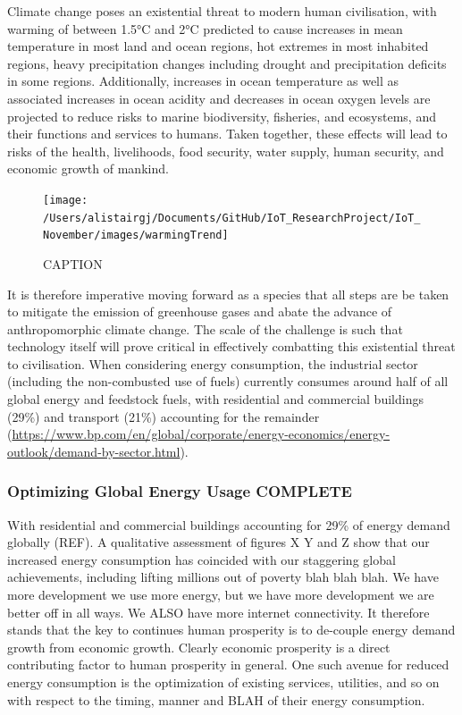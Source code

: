 \documentclass[11pt,]{article}
\begin{document}
Climate change poses an existential threat to modern human civilisation,
with warming of between 1.5°C and 2°C predicted to cause increases in
mean temperature in most land and ocean regions, hot extremes in most
inhabited regions, heavy precipitation changes including drought and
precipitation deficits in some regions. Additionally, increases in ocean
temperature as well as associated increases in ocean acidity and
decreases in ocean oxygen levels are projected to reduce risks to marine
biodiversity, fisheries, and ecosystems, and their functions and
services to humans. Taken together, these effects will lead to risks of
the health, livelihoods, food security, water supply, human security,
and economic growth of mankind.

\begin{figure}[H]

{\centering \texttt{[image: /Users/alistairgj/Documents/GitHub/IoT\_ResearchProject/IoT\_November/images/warmingTrend]} 

}

\caption{CAPTION}\label{fig:warmingTrend}
\end{figure}

It is therefore imperative moving forward as a species that all steps
are be taken to mitigate the emission of greenhouse gases and abate the
advance of anthropomorphic climate change. The scale of the challenge is
such that technology itself will prove critical in effectively
combatting this existential threat to civilisation. When considering
energy consumption, the industrial sector (including the non-combusted
use of fuels) currently consumes around half of all global energy and
feedstock fuels, with residential and commercial buildings (29\%) and
transport (21\%) accounting for the remainder
(\url{https://www.bp.com/en/global/corporate/energy-economics/energy-outlook/demand-by-sector.html}).

\hypertarget{optimizing-global-energy-usage-complete}{%
\subsubsection{Optimizing Global Energy Usage
COMPLETE}\label{optimizing-global-energy-usage-complete}}

With residential and commercial buildings accounting for 29\% of energy
demand globally (REF). A qualitative assessment of figures X Y and Z
show that our increased energy consumption has coincided with our
staggering global achievements, including lifting millions out of
poverty blah blah blah. We have more development we use more energy, but
we have more development we are better off in all ways. We ALSO have
more internet connectivity. It therefore stands that the key to
continues human prosperity is to de-couple energy demand growth from
economic growth. Clearly economic prosperity is a direct contributing
factor to human prosperity in general. One such avenue for reduced
energy consumption is the optimization of existing services, utilities,
and so on with respect to the timing, manner and BLAH of their energy
consumption.
\end{document}

